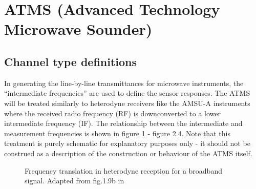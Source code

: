 \section{ATMS (Advanced Technology Microwave Sounder)}

\subsection{Channel type definitions}
In generating the line-by-line transmittances for microwave instruments, the ``intermediate frequencies'' are used to define the sensor responses. The ATMS will be treated similarly to heterodyne receivers like the AMSU-A instruments where the received radio frequency (RF) is downconverted to a lower intermediate frequency (IF). The relationship between the intermediate and measurement frequencies is shown in figure \ref{fig:broadband_frequency_translation} - figure 2.4. Note that this treatment is purely schematic for explanatory purposes only - it should not be construed as a description of the construction or behaviour of the ATMS itself.
\begin{figure}[htp]
  \centering
  
  \caption{Frequency translation in heterodyne reception for a broadband signal. Adapted from fig.1.9b in \citet{Janssen_1993}}
  \label{fig:broadband_frequency_translation}
\end{figure}

